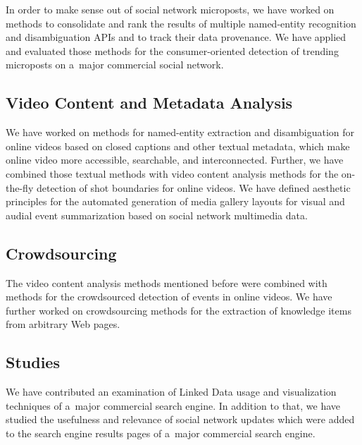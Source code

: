 In order to make sense out of social network microposts,
we have worked on methods to consolidate and rank
the results of multiple named-entity recognition and
disambiguation APIs and to track their data provenance.
We have applied and evaluated those methods
for the consumer-oriented detection of trending microposts
on a~major commercial social network.

\subsection{Video Content and Metadata Analysis}

We have worked on methods for named-entity extraction and
disambiguation for online videos based on closed captions
and other textual metadata, which make online video
more accessible, searchable, and interconnected.
Further, we have combined those textual methods with 
video content analysis methods for the on-the-fly detection
of shot boundaries for online videos.
We have defined aesthetic principles
for the automated generation of media gallery layouts
for visual and audial event summarization
based on social network multimedia data.
        
\subsection{Crowdsourcing}

The video content analysis methods mentioned before
were combined with methods for the crowdsourced detection
of events in online videos.
We have further worked on crowdsourcing methods
for the extraction of knowledge items from arbitrary Web pages.

\subsection{Studies}

We have contributed an examination of Linked Data usage and
visualization techniques of a~major commercial search engine.
In addition to that, we have studied the usefulness and relevance
of social network updates which were added to the search engine
results pages of a~major commercial search engine.

